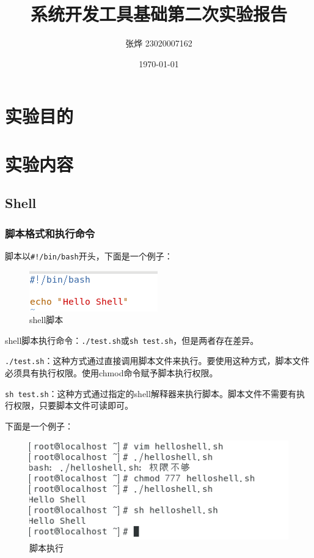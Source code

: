 \documentclass{ctexart}
\title{系统开发工具基础第二次实验报告}
\author{张烨 23020007162}
\date{\today}
\begin{document}
	\maketitle
	\tableofcontents
	\newpage
	\section{实验目的}
	\section{实验内容}
	\subsection{Shell}
	\subsubsection{脚本格式和执行命令}
	脚本以\verb|#!/bin/bash|开头，下面是一个例子：
	
	\begin{figure}[H]
		\centering
		\includegraphics{2.1}
		\caption{shell脚本}
	\end{figure}
	
	shell脚本执行命令：\verb|./test.sh|或\verb|sh test.sh|，但是两者存在差异。
	
	\verb|./test.sh|：这种方式通过直接调用脚本文件来执行。要使用这种方式，脚本文件必须具有执行权限。使用chmod命令赋予脚本执行权限。
	
	\verb|sh test.sh|：这种方式通过指定的shell解释器来执行脚本。脚本文件不需要有执行权限，只要脚本文件可读即可。
	
	下面是一个例子：
	
	\begin{figure}[H]
		\centering
		\includegraphics{2.2}
		\caption{脚本执行}
	\end{figure}
	
\end{document}

